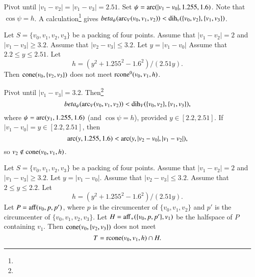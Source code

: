 \begin{tarskidata}
\begin{tarski}
\begin{proved}  Pivot until
$|v_1-v_2|=|v_1-v_3|=2.51$.   
Set
$\psi=\operatorname{arc}(|v_1-v_0|,1.255,1.6)$.  Note that $\cos\psi=h$.
A calculation\footnote{} %
gives $beta_\psi(\operatorname{arc}_V(v_0,v_1,v_2))<\operatorname{dih}_v(\{v_0,v_2\},\{v_1,v_3\})$.
\swallowed\end{proved}
\end{tarski}




\begin{tarski}

\begin{lemma} 
Let $S=\{v_0,v_1,v_2,v_3\}$ be a packing of four points.
Assume that
$|v_1-v_2|=2$ and $|v_1-v_3|\ge3.2$.
Assume that $|v_2-v_3|\le 3.2$. Let $y = |v_1-v_0|$
Assume that $2.2\le y\le 2.51$.
Let
$$
  h= (y^2+1.255^2-1.6^2)/(2.51 y).
$$
Then ${\operatorname{cone}}(v_0,\{v_2,v_3\})$ does not meet
${\operatorname{rcone}}^0(v_0,v_1,h)$.
\end{lemma}


\begin{proved}
Pivot until
$|v_1-v_3|=3.2$. Then\footnote{} %
    $$beta_\psi(\operatorname{arc}_V(v_0,v_1,v_2))< \operatorname{dih}_V(\{v_0,v_2\},\{v_1,v_3\}),$$
where $\psi=\operatorname{arc}(y_1,1.255,1.6)$ (and $\cos\psi=h$),
provided $y\in[2.2,2.51]$. If
$|v_1-v_0|=y\in[2.2,2.51]$, then
    $$\operatorname{arc}(y,1.255,1.6)<\operatorname{arc}(y,|v_2-v_0|,|v_1-v_2|),$$
so $v_2\not\in{\operatorname{cone}}(v_0,v_1,h)$.
\swallowed\end{proved}
\end{tarski}






\begin{tarski}

\begin{lemma} 
Let $S=\{v_0,v_1,v_2,v_3\}$ be a packing of four points.
Assume that
$|v_1-v_2|=2$ and $|v_1-v_3|\ge3.2$.
Let $y = |v_1-v_0|$.
Assume that $|v_2-v_3|\le 3.2$.
Assume that $2\le y\le 2.2$.
Let 
$$
  h=(y^2+1.255^2-1.6^2)/(2.51 y).
$$
Let $P={\operatorname{aff}}(v_0,p,p')$, where $p$ is the circumcenter
of $\{v_0,v_1,v_2\}$ and $p'$ is the circumcenter of $\{v_0,v_1,v_2,v_3\}$.  
Let $H = {\operatorname{aff}}_+(\{v_0,p,p'\},v_1)$ 
be the halfspace of $P$ containing
$v_1$. 
Then ${\operatorname{cone}}(v_0,\{v_2,v_3\})$ does not meet
$$
  T={\operatorname{rcone}}(v_0,v_1,h) \cap H.
$$
\end{lemma}


\end{tarski}
\end{tarskidata}
